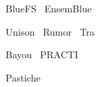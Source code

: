 BlueFS~\cite{nightingale:bluefs}
EnsemBlue~\cite{nightingale:bluefs}



Unison~\cite{balasubramanian:unison}
Rumor~\cite{guy:rumor}
Tra~\cite{cox:tra}

Bayou~\cite{petersen:flexible-update}
PRACTI~\cite{belaramani:practi}

Pastiche~\cite{cox:pastiche,nguyen:friendstore}


